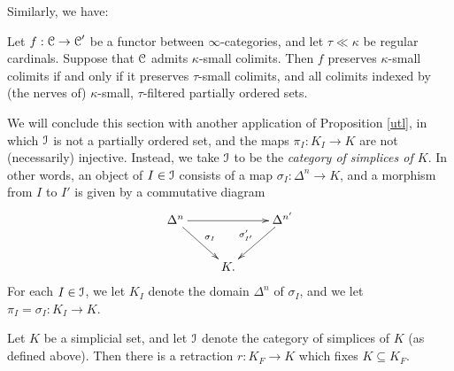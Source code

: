 Similarly, we have:

\begin{corollary}
Let $f: \operatorname{\mathcal{C}} \rightarrow \operatorname{\mathcal{C}}'$ be a functor between $\infty$-categories, and let
$\tau \ll \kappa$ be regular cardinals. Suppose that
$\operatorname{\mathcal{C}}$ admits $\kappa$-small colimits. Then $f$ preserves $\kappa$-small colimits if and only if it preserves $\tau$-small colimits, and all colimits indexed by (the nerves of) $\kappa$-small, $\tau$-filtered partially ordered sets.
\end{corollary}

We will conclude this section with another application of Proposition
\ref{utl}, in which $\operatorname{\mathcal{I}}$ is not a partially ordered
set, and the maps $\pi_I: K_I \rightarrow K$ are not (necessarily)
injective. Instead, we take $\operatorname{\mathcal{I}}$ to be the {\it category of
simplices of $K$}. In other words, an object of $I \in \operatorname{\mathcal{I}}$ consists
of a map $\sigma_I: \Delta^n \rightarrow K$, and a morphism
from $I$ to $I'$ is given by a commutative diagram
$$ \xymatrix{ \Delta^n \ar[dr]^{\sigma_I} \ar[rr] & & \Delta^{n'} \ar[dl]_{\sigma'_{I'}} \\
& K. & }$$
For each $I \in \operatorname{\mathcal{I}}$, we let $K_I$ denote the domain $\Delta^n$ of $\sigma_I$, and we
let $\pi_{I} = \sigma_I: K_I \rightarrow K$.

\begin{lemma}\label{snick}
Let $K$ be a simplicial set, and let $\operatorname{\mathcal{I}}$ denote the
category of simplices of $K$ (as defined above). Then there is a
retraction $r: K_{F} \rightarrow K$ which fixes $K \subseteq K_F$.
\end{lemma}

